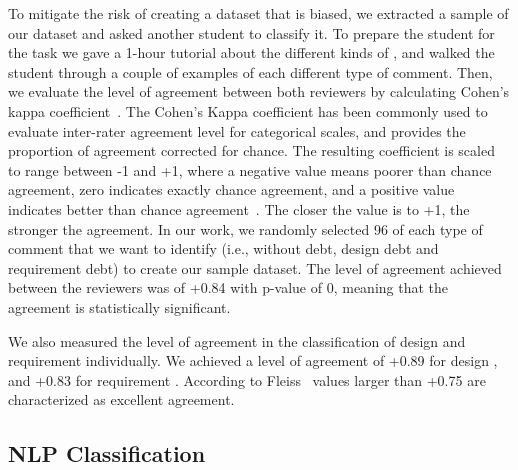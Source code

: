 To mitigate the risk of creating a dataset that is biased, we extracted a sample of our dataset and asked another student to classify it. To prepare the student for the task we gave a 1-hour tutorial about the different kinds of \SATD, and walked the student through a couple of examples of each different type of \SATD comment. Then, we evaluate the level of agreement between both reviewers by calculating Cohen's kappa coefficient~\cite{cohen1960coefficient}. The Cohen's Kappa coefficient has been commonly used to evaluate inter-rater agreement level for categorical scales, and provides the proportion of agreement corrected for chance. The resulting coefficient is scaled to range between -1 and +1, where a negative value means poorer than chance agreement, zero indicates exactly chance agreement, and a positive value indicates better than chance agreement~\cite{fleiss1973equivalence}. The closer the value is to +1, the stronger the agreement. In our work, we randomly selected 96 of each type of \SATD comment that we want to identify (i.e., without debt, design debt and requirement debt) to create our sample dataset. The level of agreement achieved between the reviewers was of +0.84 with p-value of 0, meaning that the agreement is statistically significant. 

We also measured the level of agreement in the classification of design and requirement \SATD individually. We achieved a level of agreement of +0.89 for design \SATD, and +0.83 for requirement \SATD. According to Fleiss~\cite{Fleiss1981measurement} values larger than +0.75 are characterized as excellent agreement.

\subsection{NLP Classification}
\label{sub:run_the_nlp_classifier}


